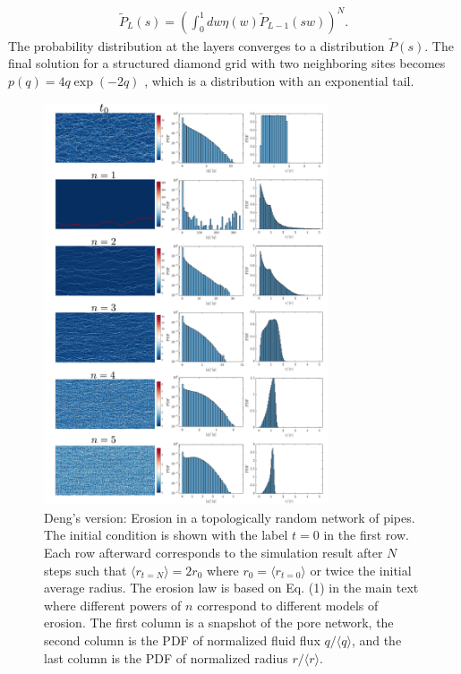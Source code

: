 \documentclass[%
 amsmath,amssymb,
prstper,
]{revtex4-2}
\def\lp{\left(}
\def\rp{\right)}
\begin{document}
%
%
\begin{align}
  {\tilde P_L(s) = \lp  \int_0^1 d w \eta(w) \tilde P_{L-1}(s w)  \rp^{N}}. \label{eq:main-laplace}
\end{align}
%
The probability distribution at the layers converges to a distribution $\tilde P(s)$. The final solution for a structured diamond grid with two neighboring sites becomes $p(q) = 4q\exp(-2q)$ \cite{liu1995force,coppersmith1996model,alim2017local}, which is a distribution with an exponential tail. 




\newpage

\begin{figure}[h]
    \includegraphics[width=0.75\textwidth]{Figs/randomNetworkErosion3.pdf}
    \caption{Deng's version: Erosion in a topologically random network of pipes. The initial condition is shown with the label $t=0$ in the first row. Each row afterward corresponds to the simulation result after $N$ steps such that $\langle r_{t=N}\rangle=2r_0$ where $r_0 = \langle r_{t=0}\rangle$ or twice the initial average radius. The erosion law is based on Eq. (1) in the main text where different powers of $n$ correspond to different models of erosion. The first column is a snapshot of the pore network, the second column is the PDF of normalized fluid flux $q/\langle q \rangle$, and the last column is the PDF of normalized radius $r/\langle r\rangle$.}\label{fig:fig2}
\end{figure}



\end{document}
